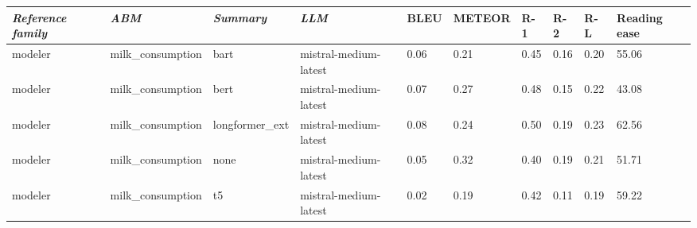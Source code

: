 \begin{tabular}{|l|l|l|l|l|l|l|l|l|l|}
\hline
\textit{\textbf{Reference family}} & \textit{\textbf{ABM}} & \textit{\textbf{Summary}} & \textit{\textbf{LLM}} & BLEU & METEOR & R-1 & R-2 & R-L & Reading ease \\
 \hline
 modeler & milk\_consumption & bart & mistral-medium-latest & 0.06 & 0.21 & 0.45 & 0.16 & 0.20 & 55.06 \\
 \hline
 modeler & milk\_consumption & bert & mistral-medium-latest & 0.07 & 0.27 & 0.48 & 0.15 & 0.22 & 43.08 \\
 \hline
 modeler & milk\_consumption & longformer\_ext & mistral-medium-latest & 0.08 & 0.24 & 0.50 & 0.19 & 0.23 & 62.56 \\
 \hline
 modeler & milk\_consumption & none & mistral-medium-latest & 0.05 & 0.32 & 0.40 & 0.19 & 0.21 & 51.71 \\
 \hline
 modeler & milk\_consumption & t5 & mistral-medium-latest & 0.02 & 0.19 & 0.42 & 0.11 & 0.19 & 59.22 \\
\hline
\end{tabular}
